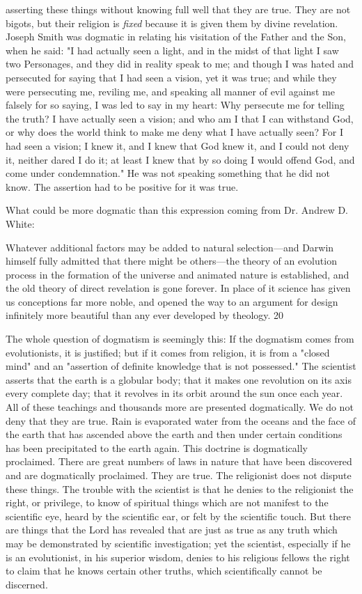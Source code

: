 asserting these things without knowing full well that they are true. They are not bigots, but
their religion is \textit{fixed} because it is given them by divine revelation. Joseph Smith was
dogmatic in relating his visitation of the Father and the Son, when he said: "I had actually
seen a light, and in the midst of that light I saw two Personages, and they did in reality speak
to me; and though I was hated and persecuted for saying that I had seen a vision, yet it was
true; and while they were persecuting me, reviling me, and speaking all manner of evil
against me falsely for so saying, I was led to say in my heart: Why persecute me for telling
the truth? I have actually seen a vision; and who am I that I can withstand God, or why does
the world think to make me deny what I have actually seen? For I had seen a vision; I knew
it, and I knew that God knew it, and I could not deny it, neither dared I do it; at least I knew
that by so doing I would offend God, and come under condemnation." He was not speaking
something that he did not know. The assertion had to be positive for it was true.

What could be more dogmatic than this expression coming from Dr. Andrew D. White:

Whatever additional factors may be added to natural selection—and Darwin himself fully
admitted that there might be others—the theory of an evolution process in the formation of
the universe and animated nature is established, and the old theory of direct revelation is
gone forever. In place of it science has given us conceptions far more noble, and opened the
way to an argument for design infinitely more beautiful than any ever developed by theology.
20

The whole question of dogmatism is seemingly this: If the dogmatism comes from
evolutionists, it is justified; but if it comes from religion, it is from a "closed mind" and an
"assertion of definite knowledge that is not possessed." The scientist asserts that the earth is a
globular body; that it makes one revolution on its axis every complete day; that it revolves in
its orbit around the sun once each year. All of these teachings and thousands more are
presented dogmatically. We do not deny that they are true. Rain is evaporated water from the
oceans and the face of the earth that has ascended above the earth and then under certain
conditions has been precipitated to the earth again. This doctrine is dogmatically proclaimed.
There are great numbers of laws in nature that have been discovered and are dogmatically
proclaimed. They are true. The religionist does not dispute these things. The trouble with the
scientist is that he denies to the religionist the right, or privilege, to know of spiritual things
which are not manifest to the scientific eye, heard by the scientific ear, or felt by the
scientific touch. But there are things that the Lord has revealed that are just as true as any
truth which may be demonstrated by scientific investigation; yet the scientist, especially if he
is an evolutionist, in his superior wisdom, denies to his religious fellows the right to claim
that he knows certain other truths, which scientifically cannot be discerned.

